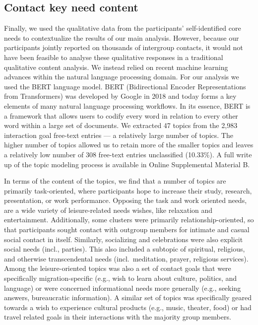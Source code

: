 \subsection{Contact key need content}

Finally, we used the qualitative data from the participants'
self-identified core needs to contextualize the results of our main
analysis. However, because our participants jointly reported on
thousands of intergroup contacts, it would not have been feasible to
analyse these qualitative responses in a traditional qualitative content
analysis. We instead relied on recent machine learning advances within
the natural language processing domain. For our analysis we used the
BERT language model. BERT (Bidirectional Encoder Representations from
Transformers) was developed by Google in 2018 and today forms a key
elements of many natural language processing workflows. In its essence,
BERT is a framework that allows users to codify every word in relation
to every other word within a large set of documents. We extracted 47
topics from the 2,983 interaction goal free-text entries --- a
relatively large number of topics. The higher number of topics allowed
us to retain more of the smaller topics and leaves a relatively low
number of 308 free-text entries unclassified (10.33\%). A full write up
of the topic modeling process is available in Online Supplemental
Material B.

In terms of the content of the topics, we find that a number of topics
are primarily task-oriented, where participants hope to increase their
study, research, presentation, or work performance. Opposing the task
and work oriented needs, are a wide variety of leisure-related needs
wishes, like relaxation and entertainment. Additionally, some clusters
were primarily relationship-oriented, so that participants sought
contact with outgroup members for intimate and casual social contact in
itself. Similarly, socializing and celebrations were also explicit
social needs (incl., parties). This also included a subtopic of
spiritual, religious, and otherwise transcendental needs
(incl.~meditation, prayer, religious services). Among the
leisure-oriented topics was also a set of contact goals that were
specifically migration-specific (e.g., wish to learn about culture,
politics, and language) or were concerned informational needs more
generally (e.g., seeking answers, bureaucratic information). A similar
set of topics was specifically geared towards a wish to experience
cultural products (e.g., music, theater, food) or had travel related
goals in their interactions with the majority group members.

